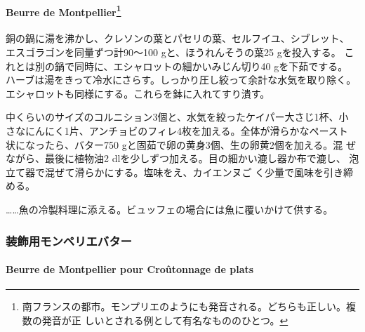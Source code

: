 \begin{recette}
\hypertarget{beurre-de-montpellier}{%
\paragraph[Beurre de Montpellier]{\texorpdfstring{Beurre de
Montpellier\footnote{南フランスの都市。モンプリエのようにも発音される。どちらも正しい。複数の発音が正
  しいとされる例として有名なもののひとつ。}}{Beurre de Montpellier}}\label{beurre-de-montpellier}}


銅の鍋に湯を沸かし、クレソンの葉とパセリの葉、セルフイユ、シブレット、
エスゴラゴンを同量ずつ計90〜100 gと、ほうれんそうの葉25 gを投入する。
これとは別の鍋で同時に、エシャロットの細かいみじん切り40 gを下茹でする。
ハーブは湯をきって冷水にさらす。しっかり圧し絞って余計な水気を取り除く。
エシャロットも同様にする。これらを鉢に入れてすり潰す。

中くらいのサイズのコルニション3個と、水気を絞ったケイパー大さじ1杯、小
さなにんにく1片、アンチョビのフィレ4枚を加える。全体が滑らかなペースト
状になったら、バター750 gと固茹で卵の黄身3個、生の卵黄2個を加える。混
ぜながら、最後に植物油2 dlを少しずつ加える。目の細かい漉し器か布で漉し、
泡立て器で混ぜて滑らかにする。塩味をえ、カイエンヌご
く少量で風味を引き締める。

\ldots{}\ldots{}魚の冷製料理に添える。ビュッフェの場合には魚に覆いかけて供する。

\maeaki

\hypertarget{ux88c5ux98feux7528ux30e2ux30f3ux30daux30eaux30a8ux30d0ux30bfux30fc}{%
\subsubsection{装飾用モンペリエバター}\label{ux88c5ux98feux7528ux30e2ux30f3ux30daux30eaux30a8ux30d0ux30bfux30fc}}

\hypertarget{beurre-de-montpellier-pour-croutonnage-de-plats}{%
\paragraph{Beurre de Montpellier pour Croûtonnage de
plats}\label{beurre-de-montpellier-pour-croutonnage-de-plats}}


\end{recette}
